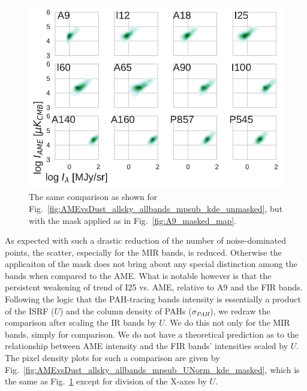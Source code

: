               \begin{figure}
                \includegraphics[width=\textwidth]{../Plots/ch_allsky/AMEvsDust_allsky_allbands_mpsub_kde_masked.pdf}
                \centering
                \caption{The same comparison as shown for Fig.~\ref{fig:AMEvsDust_allsky_allbands_mpsub_kde_unmasked}, but with the mask applied as in Fig.~\ref{fig:A9_masked_map}.}
                \label{fig:AMEvsDust_allsky_allbands_mpsub_kde_masked}
              \end{figure}
            As expected with such a drastic reduction of the number of noise-dominated points, the scatter, especially for the MIR bands, is reduced. Otherwise the applicaiton of the mask does not bring about any special distinction among the bands when compared to the AME. What is notable however is that the persistent weakening of trend of I25 vs. AME, relative to A9 and the FIR bands. Following the logic that the PAH-tracing bands intensity is essentially a product of the ISRF ($U$) and the column density of PAHs ($\sigma_{PAH}$), we redraw the comparison after scaling the IR bands by $U$. We do this not only for the MIR bands, simply for comparison. We do not have a theoretical prediction as to the relationship between AME intensity and the FIR bands' intensities scaled by $U$. The pixel density plots for such a comparison are given by Fig.~\ref{fig:AMEvsDust_allsky_allbands_mpsub_UNorm_kde_masked}, which is the same as Fig.~\ref{fig:AMEvsDust_allsky_allbands_mpsub_kde_masked} except for division of the X-axes by $U$.
